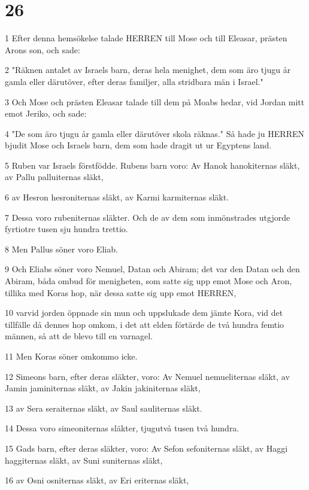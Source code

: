 \chapter{26}

\par 1 Efter denna hemsökelse talade HERREN till Mose och till Eleasar, prästen Arons son, och sade:
\par 2 "Räknen antalet av Israels barn, deras hela menighet, dem som äro tjugu år gamla eller därutöver, efter deras familjer, alla stridbara män i Israel."
\par 3 Och Mose och prästen Eleasar talade till dem på Moabs hedar, vid Jordan mitt emot Jeriko, och sade:
\par 4 "De som äro tjugu år gamla eller därutöver skola räknas." Så hade ju HERREN bjudit Mose och Israels barn, dem som hade dragit ut ur Egyptens land.
\par 5 Ruben var Israels förstfödde. Rubens barn voro: Av Hanok hanokiternas släkt, av Pallu palluiternas släkt,
\par 6 av Hesron hesroniternas släkt, av Karmi karmiternas släkt.
\par 7 Dessa voro rubeniternas släkter. Och de av dem som inmönstrades utgjorde fyrtiotre tusen sju hundra trettio.
\par 8 Men Pallus söner voro Eliab.
\par 9 Och Eliabs söner voro Nemuel, Datan och Abiram; det var den Datan och den Abiram, båda ombud för menigheten, som satte sig upp emot Mose och Aron, tillika med Koras hop, när dessa satte sig upp emot HERREN,
\par 10 varvid jorden öppnade sin mun och uppslukade dem jämte Kora, vid det tillfälle då dennes hop omkom, i det att elden förtärde de två hundra femtio männen, så att de blevo till en varnagel.
\par 11 Men Koras söner omkommo icke.
\par 12 Simeons barn, efter deras släkter, voro: Av Nemuel nemueliternas släkt, av Jamin jaminiternas släkt, av Jakin jakiniternas släkt,
\par 13 av Sera seraiternas släkt, av Saul sauliternas släkt.
\par 14 Dessa voro simeoniternas släkter, tjugutvå tusen två hundra.
\par 15 Gads barn, efter deras släkter, voro: Av Sefon sefoniternas släkt, av Haggi haggiternas släkt, av Suni suniternas släkt,
\par 16 av Osni osniternas släkt, av Eri eriternas släkt,
